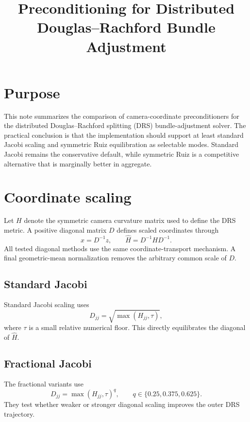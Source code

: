 \documentclass[11pt]{article}
\title{Preconditioning for Distributed Douglas--Rachford Bundle Adjustment}
\author{}
\date{}
\begin{document}
\maketitle

\section{Purpose}

This note summarizes the comparison of camera-coordinate preconditioners for
the distributed Douglas--Rachford splitting (DRS) bundle-adjustment solver.
The practical conclusion is that the implementation should support at least
standard Jacobi scaling and symmetric Ruiz equilibration as selectable modes.
Standard Jacobi remains the conservative default, while symmetric Ruiz is a
competitive alternative that is marginally better in aggregate.

\section{Coordinate scaling}

Let $H$ denote the symmetric camera curvature matrix used to define the DRS
metric.  A positive diagonal matrix $D$ defines scaled coordinates through
\begin{equation}
  x = D^{-1}z,
  \qquad
  \widehat H = D^{-1} H D^{-1}.
\end{equation}
All tested diagonal methods use the same coordinate-transport mechanism.  A
final geometric-mean normalization removes the arbitrary common scale of $D$.

\subsection{Standard Jacobi}

Standard Jacobi scaling uses
\begin{equation}
  D_{jj} = \sqrt{\max(H_{jj},\tau)},
\end{equation}
where $\tau$ is a small relative numerical floor.  This directly equilibrates
the diagonal of $\widehat H$.

\subsection{Fractional Jacobi}

The fractional variants use
\begin{equation}
  D_{jj} = \max(H_{jj},\tau)^q,
  \qquad q\in\{0.25,0.375,0.625\}.
\end{equation}
They test whether weaker or stronger diagonal scaling improves the outer DRS
trajectory.
\end{document}
